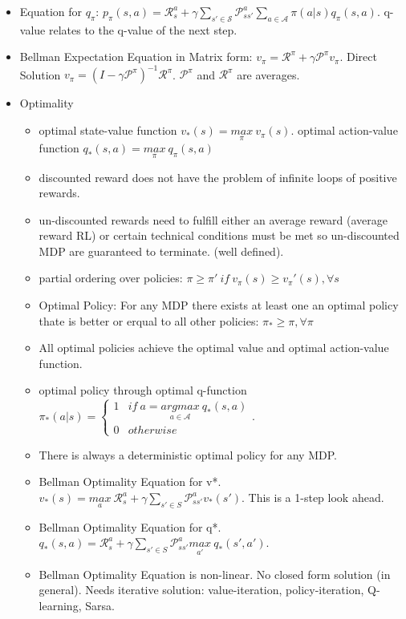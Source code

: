 \begin{itemize}
\begin{itemize}[noitemsep,nolistsep]
		\item Equation for $q_\pi$: $p_\pi(s,a) = \mathcal{R}_s^a + \gamma \sum_{s' \in \mathcal{S}} \mathcal{P}_{ss'}^a \sum_{a \in \mathcal{A}} \pi(a|s)q_\pi(s,a)$. q-value relates to the q-value of the next step.
		\item Bellman Expectation Equation in Matrix form: $v_\pi = \mathcal{R}^\pi + \gamma \mathcal{P}^\pi v_\pi$. Direct Solution $v_\pi = (I - \gamma \mathcal{P}^\pi)^{-1}\mathcal{R}^\pi$. $\mathcal{P}^\pi$ and $\mathcal{R}^\pi$ are averages.
		\item Optimality 
		\begin{itemize}[noitemsep,nolistsep]
			\item optimal state-value function $v_*(s) = \underset{\pi}{max}\ v_\pi(s)$. optimal action-value function $q_*(s,a) = \underset{\pi}{max}\ q_\pi(s,a)$
			\item discounted reward does not have the problem of infinite loops of positive rewards.
			\item un-discounted rewards need to fulfill either an average reward (average reward RL) or certain technical conditions must be met so un-discounted MDP are guaranteed to terminate. (well defined).
			\item partial ordering over policies: $\pi \geq \pi'\ if\ v_\pi(s) \geq v_\pi'(s), \forall s$
			\item Optimal Policy: For any MDP there exists at least one an optimal policy thate is better or erqual to all other policies: $\pi_* \geq \pi, \forall \pi$
			\item All optimal policies achieve the optimal value and optimal action-value function.
			\item optimal policy through optimal q-function $\pi_*(a|s) = \begin{cases} 1 & if\ a = \underset{a \in \mathcal{A}}{argmax}\ q_*(s,a) \\  0 & otherwise \end{cases}$.
			\item There is always a deterministic optimal policy for any MDP.
			\item Bellman Optimality Equation for v*. $v_*(s) = \underset{a}{max}\ \mathcal{R}_s^a + \gamma \sum_{s' \in S} \mathcal{P}_{ss'}^a v_*(s')$. This is a 1-step look ahead.
			\item Bellman Optimality Equation for q*. $q_*(s,a) = \mathcal{R}_s^a + \gamma \sum_{s' \in S} \mathcal{P}_{ss'}^a \underset{a'}{max}\ q_*(s',a')$.
			\item Bellman Optimality Equation is non-linear. No closed form solution (in general). Needs iterative solution: value-iteration, policy-iteration, Q-learning, Sarsa.

\end{itemize}
\end{itemize}
\end{itemize}
